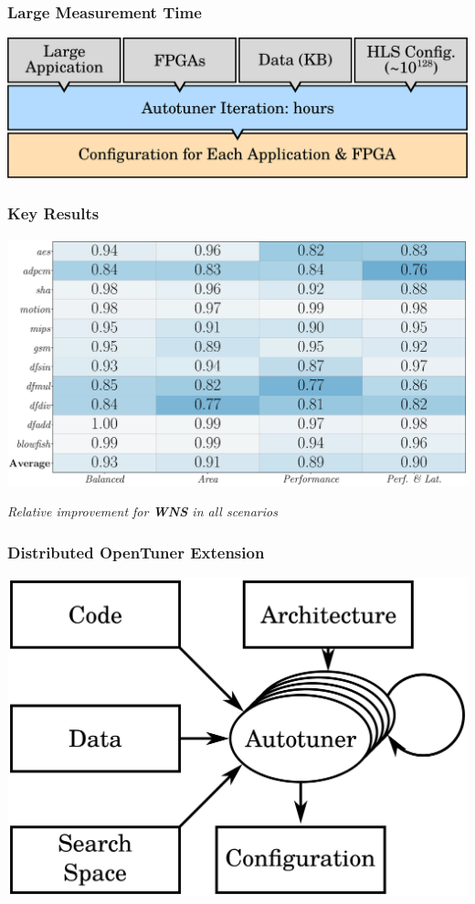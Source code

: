 \documentclass[10pt, compress, aspectratio=169]{beamer}
\begin{document}
\begin{frame}
    \frametitle{Large Measurement Time}
    \begin{center}
        \includegraphics[width=.9\textwidth]{overview_fpgas_big}
    \end{center}
\end{frame}

\begin{frame}
    \frametitle{Key Results}
    \begin{center}
        \includegraphics[width=.9\textwidth]{heatmap_wns_comparison}

        \emph{Relative improvement for \textbf{WNS} in all scenarios}
    \end{center}
\end{frame}

\begin{frame}
    \frametitle{Distributed OpenTuner Extension}
    \begin{center}
        \includegraphics[width=.9\textwidth]{overview_distributed}
    \end{center}
\end{frame}
\end{document}
